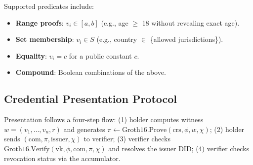 Supported predicates include:

\begin{itemize}
\item \textbf{Range proofs}: $v_i \in [a, b]$ (e.g., age $\geq$ 18 without revealing exact age).
\item \textbf{Set membership}: $v_i \in S$ (e.g., country $\in$ \{allowed jurisdictions\}).
\item \textbf{Equality}: $v_i = c$ for a public constant $c$.
\item \textbf{Compound}: Boolean combinations of the above.
\end{itemize}

\subsection{Credential Presentation Protocol}

Presentation follows a four-step flow: (1) holder computes witness $w = (v_1, \ldots, v_n, r)$ and generates $\pi \leftarrow \text{Groth16.Prove}(\text{crs}, \phi, w, \chi)$; (2) holder sends $(\text{com}, \pi, \text{issuer}, \chi)$ to verifier; (3) verifier checks $\text{Groth16.Verify}(\text{vk}, \phi, \text{com}, \pi, \chi)$ and resolves the issuer DID; (4) verifier checks revocation status via the accumulator.


